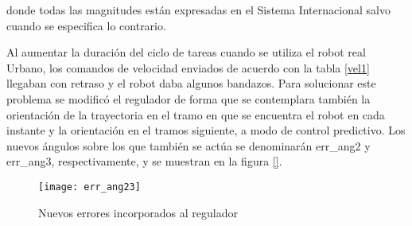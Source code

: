 donde todas las magnitudes están expresadas en el Sistema Internacional salvo cuando se especifica lo contrario.

Al aumentar la duración del ciclo de tareas cuando se utiliza el robot real Urbano, los comandos de velocidad enviados de acuerdo con la tabla \ref{vel1} llegaban con retraso y el robot daba algunos bandazos. Para solucionar este problema se modificó el regulador de forma que se contemplara también la orientación de la trayectoria en el tramo en que se encuentra el robot en cada instante y la orientación en el tramos siguiente, a modo de control predictivo. Los nuevos ángulos sobre los que también se actúa se denominarán err\_ang2 y err\_ang3, respectivamente, y se muestran en la figura \ref{}.
\begin{figure}[hbt]
  \centering\texttt{[image: err\_ang23]}\\
  \caption{Nuevos errores incorporados al regulador}\label{fg:err_ang23}
\end{figure} 
 
